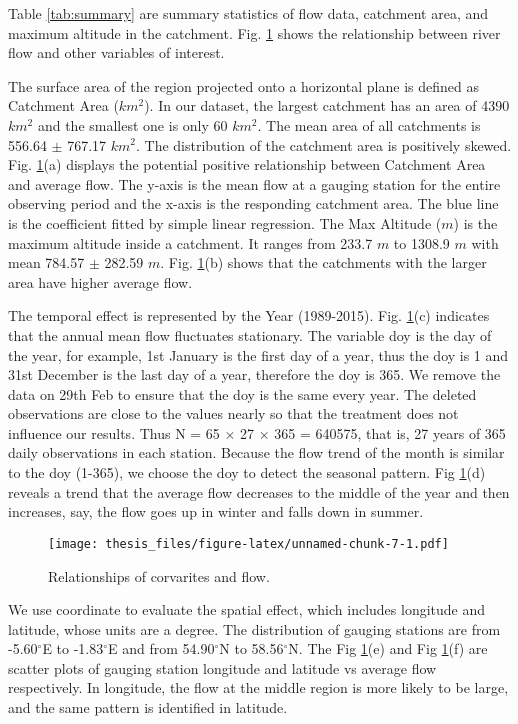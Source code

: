 \documentclass[12pt,oneside]{reedthesis}
\begin{document}
Table \ref{tab:summary} are summary statistics of flow data, catchment area, and maximum altitude in the catchment. Fig. \ref{fig:relation} shows the relationship between river flow and other variables of interest.

The surface area of the region projected onto a horizontal plane is defined as Catchment Area (\(km^2\)). In our dataset, the largest catchment has an area of 4390 \(km^2\) and the smallest one is only 60 \(km^2\). The mean area of all catchments is 556.64 \(\pm\) 767.17 \(km^2\). The distribution of the catchment area is positively skewed. Fig. \ref{fig:relation}(a) displays the potential positive relationship between Catchment Area and average flow. The y-axis is the mean flow at a gauging station for the entire observing period and the x-axis is the responding catchment area. The blue line is the coefficient fitted by simple linear regression. The Max Altitude (\(m\)) is the maximum altitude inside a catchment. It ranges from 233.7 \(m\) to 1308.9 \(m\) with mean 784.57 \(\pm\) 282.59 \(m\). Fig. \ref{fig:relation}(b) shows that the catchments with the larger area have higher average flow.

The temporal effect is represented by the Year (1989-2015). Fig. \ref{fig:relation}(c) indicates that the annual mean flow fluctuates stationary. The variable doy is the day of the year, for example, 1st January is the first day of a year, thus the doy is 1 and 31st December is the last day of a year, therefore the doy is 365. We remove the data on 29th Feb to ensure that the doy is the same every year. The deleted observations are close to the values nearly so that the treatment does not influence our results. Thus N = 65 × 27 × 365 = 640575, that is, 27 years of 365 daily observations in each station. Because the flow trend of the month is similar to the doy (1-365), we choose the doy to detect the seasonal pattern. Fig \ref{fig:relation}(d) reveals a trend that the average flow decreases to the middle of the year and then increases, say, the flow goes up in winter and falls down in summer.
\begin{figure}
\centering
\texttt{[image: thesis\_files/figure-latex/unnamed-chunk-7-1.pdf]}
\caption{\label{fig:unnamed-chunk-7}\label{fig:relation} Relationships of corvarites and flow.}
\end{figure}
We use coordinate to evaluate the spatial effect, which includes longitude and latitude, whose units are a degree. The distribution of gauging stations are from -5.60\(^\circ\)E to -1.83\(^\circ\)E and from 54.90\(^\circ\)N to 58.56\(^\circ\)N. The Fig \ref{fig:relation}(e) and Fig \ref{fig:relation}(f) are scatter plots of gauging station longitude and latitude vs average flow respectively. In longitude, the flow at the middle region is more likely to be large, and the same pattern is identified in latitude.
\end{document}
